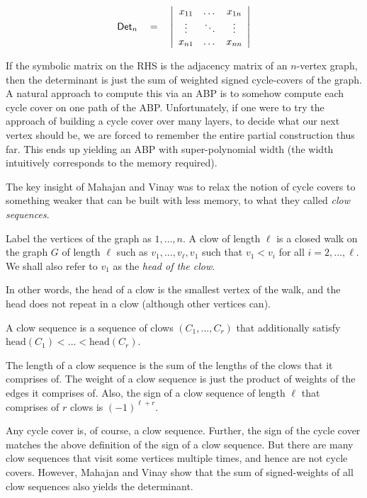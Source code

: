 \[
\operatorname{\mathsf{Det}}_n \quad = \quad \left|\begin{array}{ccc}
x_{11} & \dots & x_{1n}\\
\vdots & \ddots & \vdots \\
x_{n1} & \dots & x_{nn}
\end{array}
\right|\]

If the symbolic matrix on the RHS is the adjacency matrix of an $n$-vertex graph, then the determinant is just the sum of weighted signed cycle-covers of the graph. 
A natural approach to compute this via an ABP is to somehow compute each cycle cover on one path of the ABP. 
Unfortunately, if one were to try the \naive approach of building a cycle cover over many layers, to decide what our next vertex should be, we are forced to remember the entire partial construction thus far. 
This ends up yielding an ABP with super-polynomial width (the width intuitively corresponds to the memory required). 

The key insight of Mahajan and Vinay was to relax the notion of cycle covers to something weaker that can be built with less memory, to what they called \emph{clow sequences}. 

\begin{definition}
Label the vertices of the graph as $1,\dots, n$. 
A clow  of length $\ell$ is a closed walk on the graph $G$ of length $\ell$ such as $v_1,\dots, v_\ell,v_1$ such that $v_1 < v_i$ for all $i=2,\dots, \ell$. 
We shall also refer to $v_1$ as the \emph{head of the clow}. 

In other words, the head of a clow is the smallest vertex of the walk, and the head does not repeat in a clow (although other vertices can). 

A clow sequence is a sequence of clows $(C_1,\dots, C_r)$ that additionally satisfy $\mathrm{head}(C_1) < \dots < \mathrm{head}(C_r)$. 

The length of a clow sequence is the sum of the lengths of the clows that it comprises of. 
The weight of a clow sequence is just the product of weights of the edges it comprises of. 
Also, the sign of a clow sequence of length $\ell$ that comprises of $r$ clows is $(-1)^{\ell + r}$. 
\end{definition}

Any cycle cover is, of course, a clow sequence. 
Further, the sign of the cycle cover matches the above definition of the sign of a clow sequence. 
But there are many clow sequences that visit some vertices multiple times, and hence are not cycle covers. 
However, Mahajan and Vinay show that the sum of signed-weights of all clow sequences also yields the determinant. 


